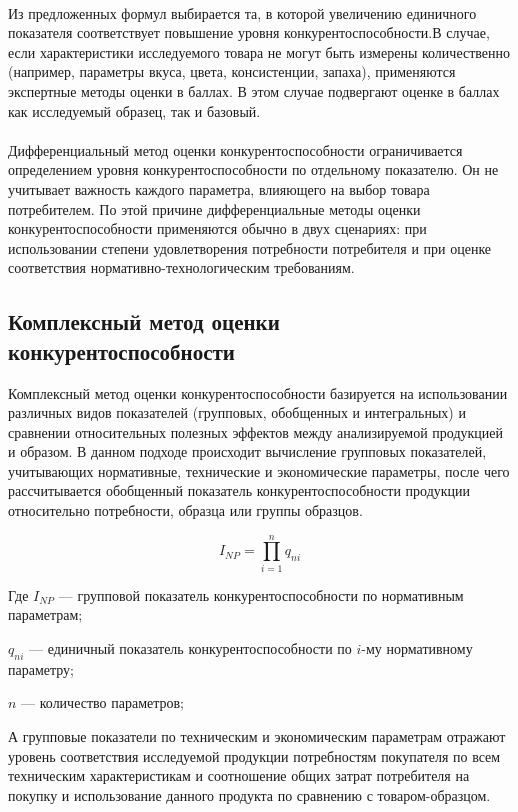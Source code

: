 \documentclass[14pt, a4paper]{extarticle}
\begin{document}
\begin{enumerate}
    \paragraph[short]{}
    Из предложенных формул выбирается та, в которой увеличению единичного
     показателя соответствует повышение уровня конкурентоспособности.В случае,
     если характеристики исследуемого товара не могут быть
     измерены количественно (например, параметры вкуса, цвета, консистенции, 
     запаха), применяются экспертные методы оценки в баллах. В этом
     случае подвергают оценке в баллах как исследуемый образец, так и базовый.
  \paragraph[short]{}
  Дифференциальный метод оценки конкурентоспособности ограничивается определением уровня конкурентоспособности по отдельному показателю. Он не учитывает важность каждого параметра, влияющего на
     выбор товара потребителем. По этой причине дифференциальные методы оценки конкурентоспособности применяются обычно в двух сценариях: при использовании степени удовлетворения потребности потребителя
     и при оценке соответствия нормативно-технологическим требованиям.
  \end{enumerate}
  \newpage
  \subsection{Комплексный метод оценки конкурентоспособности}

  Комплексный метод оценки конкурентоспособности базируется на использовании различных видов показателей (групповых, обобщенных и интегральных) и сравнении относительных полезных эффектов между анализируемой продукцией и образом. В данном подходе происходит вычисление групповых показателей, учитывающих нормативные, технические и экономические параметры, после чего рассчитывается обобщенный показатель конкурентоспособности продукции относительно потребности, образца или группы образцов.
  
  \[
  I_{NP} = \prod_{i=1}^n q_{ni}
  \]
  
  Где \(I_{NP}\) — групповой показатель конкурентоспособности по нормативным параметрам;
  
  \(q_{ni}\) — единичный показатель конкурентоспособности по \(i\)-му нормативному параметру;
  
  \(n\) — количество параметров;
  
  А групповые показатели по техническим и экономическим параметрам отражают уровень соответствия исследуемой продукции потребностям покупателя по всем техническим характеристикам и соотношение общих затрат потребителя на покупку и использование данного продукта по сравнению с товаром-образцом.
  
\end{document}
